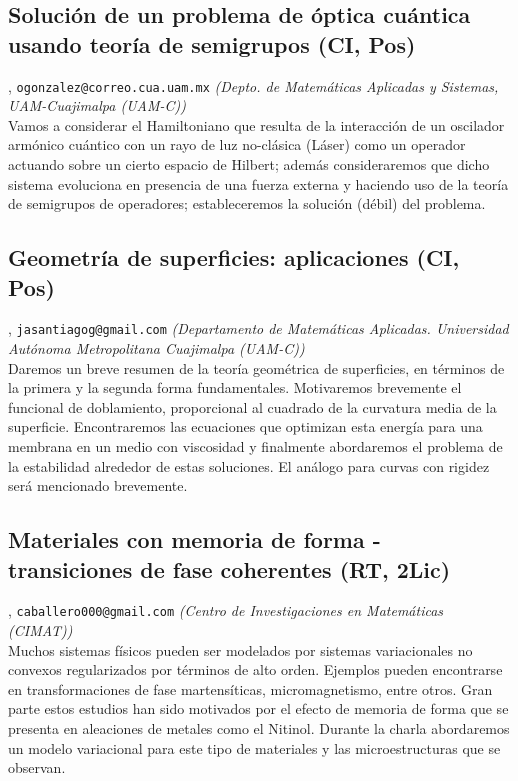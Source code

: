 \subsection{\sffamily Soluci\'on de un problema de \'optica cu\'antica usando teor\'ia  de semigrupos {\footnotesize (CI, Pos)}} \label{reg-1154} 
, {\tt ogonzalez@correo.cua.uam.mx}  {\slshape (Depto. de Matem\'aticas Aplicadas y Sistemas, UAM-Cuajimalpa (UAM-C))}\\
          \noindent Vamos a considerar el Hamiltoniano que resulta de la interacci\'on de un oscilador arm\'onico cu\'antico con un rayo de luz no-cl\'asica (L\'aser) como un operador actuando sobre un cierto espacio de Hilbert; adem\'as consideraremos que dicho sistema evoluciona en presencia de una fuerza externa y haciendo uso de la teor\'ia de semigrupos de operadores; estableceremos la soluci\'on (d\'ebil) del problema.
\subsection{\sffamily Geometr\'ia de superficies: aplicaciones {\footnotesize (CI, Pos)}} \label{reg-1389} 
, {\tt jasantiagog@gmail.com}  {\slshape (Departamento de Matem\'aticas Aplicadas. Universidad Aut\'onoma Metropolitana Cuajimalpa (UAM-C))}\\
          \noindent Daremos un breve resumen de la teor\'ia geom\'etrica de superficies, en t\'erminos de la primera y la segunda forma fundamentales. Motivaremos brevemente el funcional de doblamiento, proporcional al cuadrado de la curvatura media de la superficie. Encontraremos las ecuaciones que optimizan esta energ\'ia para una membrana en un medio con viscosidad y finalmente abordaremos el problema de la estabilidad alrededor de estas soluciones. El an\'alogo para curvas con rigidez ser\'a mencionado brevemente.
\subsection{\sffamily Materiales con memoria de forma - transiciones de fase coherentes {\footnotesize (RT, 2Lic)}} \label{reg-1319} 
, {\tt caballero000@gmail.com}  {\slshape (Centro de Investigaciones en Matem\'aticas (CIMAT))}\\
          \noindent Muchos sistemas f\'isicos pueden ser modelados por sistemas variacionales no convexos regularizados por t\'erminos de alto orden. Ejemplos pueden encontrarse en transformaciones de fase martens\'iticas, micromagnetismo, entre otros. Gran parte estos estudios han sido motivados por el efecto de memoria de forma que se presenta en aleaciones de metales como el Nitinol. Durante la charla abordaremos un modelo variacional para este tipo de materiales y las microestructuras que se observan.
